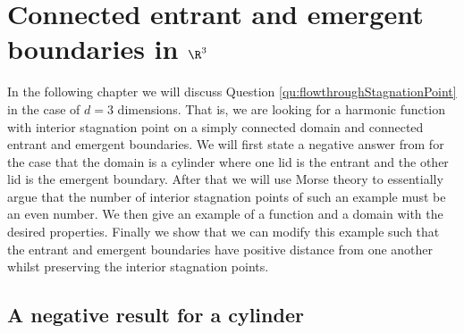 \chapter{Connected entrant and emergent boundaries in $\R^3$}
\label{ch:n3_inflowOutflow}

In the following chapter we will discuss Question \ref{qu:flowthroughStagnationPoint} in the case of $d=3$ dimensions.
That is, we are looking for a harmonic function with interior stagnation point on a simply connected domain and connected entrant and emergent
boundaries.
We will first state a negative answer from \cite{Douglas2020} for the case that the domain is a cylinder where one lid is the entrant and the other lid is the emergent boundary.
After that we will use Morse theory to essentially argue that the number of interior stagnation points
of such an example must be an even number.
We then give an example of a function and a domain with the desired properties.
Finally we show that we can modify this example such that the entrant and emergent boundaries have positive distance from one another whilst
preserving the interior stagnation points.

\section{A negative result for a cylinder}

